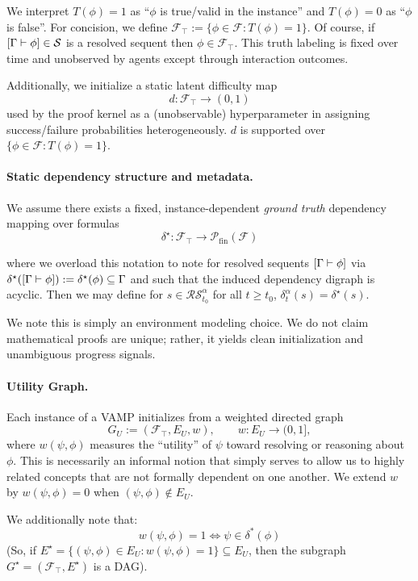 We interpret $T(\phi)=1$ as ``$\phi$ is true/valid in the instance'' and $T(\phi)=0$ as ``$\phi$ is false''. For concision, we define $\mathcal{F}_\top := \{\phi \in \mathcal F : T(\phi)=1\}$. Of course, if $[\Gamma \vdash \phi]\in\mathcal S$ is a resolved sequent then $\phi \in \mathcal{F}_\top$.
This truth labeling is fixed over time and unobserved by agents except through interaction outcomes.

Additionally, we initialize a static latent difficulty map
\[
d:\mathcal F_\top\to (0,1)
\]
used by the proof kernel as a (unobservable) hyperparameter in assigning success/failure probabilities heterogeneously. $d$ is supported over $\{\phi \in \mathcal F : T(\phi)=1\}$.

\paragraph{Static dependency structure and metadata.}
We assume there exists a fixed, instance-dependent \emph{ground truth} dependency mapping over formulas
\[
\delta^\star : \mathcal{F}_\top\to \mathcal{P}_{\mathrm{fin}}(\mathcal{F})
\]

where we overload this notation to note for resolved sequents $[\Gamma \vdash \phi]$ via $\delta^\star([\Gamma \vdash \phi]) := \delta^\star(\phi) \subseteq \Gamma$ and such that the induced dependency digraph is acyclic. Then we may define for $s \in \mathcal{RS}_{t_0}^\alpha$ for all $t \ge t_0$, $\delta^\alpha_t(s) = \delta^\star(s)$.

We note this is simply an environment modeling choice. We do not claim mathematical proofs are unique; rather, it yields clean initialization and unambiguous progress signals.

\paragraph{Utility Graph.}
Each instance of a VAMP initializes from a weighted directed graph
\[
G_U := (\mathcal F_\top, E_U, w),\qquad w:E_U\to(0,1],
\]
where $w(\psi,\phi)$ measures the ``utility'' of $\psi$ toward resolving or reasoning about $\phi$. This is necessarily an informal notion that simply serves to allow us to highly related concepts that are not formally dependent on one another. We extend $w$ by $w(\psi,\phi)=0$ when $(\psi, \phi)\notin E_U$.

We additionally note that:
\[w(\psi, \phi)=1 \iff \psi \in \delta^*(\phi)\]
(So, if $E^\star = \{(\psi,\phi) \in E_U : w(\psi,\phi)=1\} \subseteq E_U$, then the subgraph $G^\star = (\mathcal{F}_\top,E^\star)$ is a DAG).


